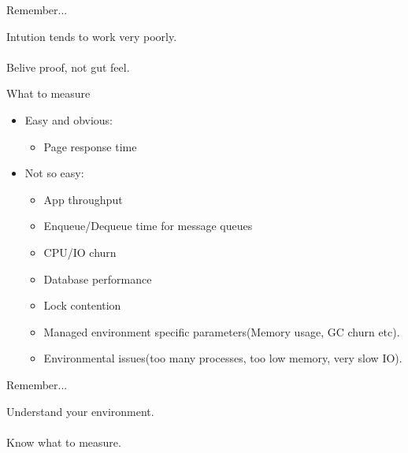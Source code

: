 \documentclass{beamer}
\begin{document}
\begin{frame}{Remember...}
  \begin{center}
    \large{Intution tends to work very poorly.}\quad\\
    \quad\\
    \small{Belive proof, not gut feel.}
  \end{center}
\end{frame}

\begin{frame}{What to measure}
  \begin{itemize}
  \item Easy and obvious: 
    \begin{itemize}
    \item Page response time
    \end{itemize}
    \pause
  \item Not so easy:
    \begin{itemize}
      \item App throughput
      \item Enqueue/Dequeue time for message queues
      \item CPU/IO churn
      \item Database performance
      \item Lock contention
      \item Managed environment specific parameters(Memory usage, GC churn etc).
      \item Environmental issues(too many processes, too low memory, very slow IO).
    \end{itemize}
  \end{itemize}
\end{frame}

\begin{frame}{Remember...}
  \begin{center}
    \large{Understand your environment.}\quad\\
    \quad\\
    \small{Know what to measure.}
  \end{center}
\end{frame}
\end{document}
